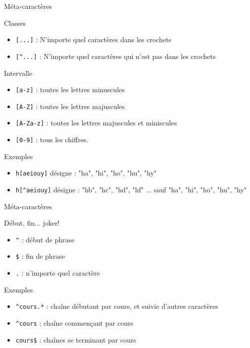 \def\ftitle{Méta-caractères}
\begin{frame}[containsverbatim]{\ftitle}
\def\blocktitle{Classes}
\begin{block}{\blocktitle}
\begin{itemize}
\item \verb![...]! : N'importe quel caractères dans les crochets
\item \verb![^...]! : N'importe quel caractères qui n'est pas dans les crochets
\end{itemize}
\end{block}

\def\blocktitle{Intervalle}
\begin{block}{\blocktitle}
\begin{itemize}
\item \verb![a-z]! : toutes les lettres minuscules
\item \verb![A-Z]! : toutes les lettres majuscules
\item \verb![A-Za-z]! : toutes les lettres majuscules et miniscules
\item \verb![0-9]! : tous les chiffres.
\end{itemize}
\end{block}

\def\blocktitle{Exemples}
\begin{block}{\blocktitle}
\begin{itemize}
\item \verb!h[aeiouy]! désigne : "ha", "hi", "ho", "hu", "hy"
\item \verb!h[^aeiouy]! désigne : "hb", "hc", "hd", "hf" ... sauf "ha", "hi", "ho", "hu", "hy"
\end{itemize}
\end{block}
\end{frame}


\begin{frame}[containsverbatim]{\ftitle}
\def\blocktitle{Début, fin... joker!}
\begin{block}{\blocktitle}
\begin{itemize}
\item \verb!^! : début de phrase
\item \verb!$! : fin de phrase %
\item \verb!.! : n'importe quel caractère
\end{itemize}
\end{block}

\def\blocktitle{Exemples}
\begin{block}{\blocktitle}
\begin{itemize}
\item \verb!^cours.*! : chaîne débutant par cours, et suivie d'autres caractères
\item \verb!^cours! : chaîne commençant par cours
\item \verb!cours$! : chaînes se terminant par cours %
\end{itemize}
\end{block}
\end{frame}


